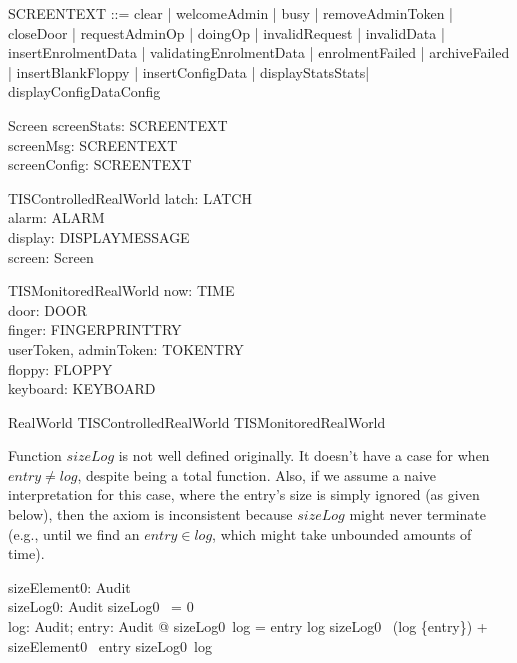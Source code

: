 \begin{zed}
SCREENTEXT ::= clear | welcomeAdmin | busy | removeAdminToken | closeDoor | requestAdminOp | doingOp | invalidRequest | invalidData | insertEnrolmentData | validatingEnrolmentData | enrolmentFailed | archiveFailed | insertBlankFloppy | insertConfigData | displayStats\ldata Stats\rdata | displayConfigData\ldata Config\rdata
\end{zed}

\begin{schema}{Screen}
  screenStats: SCREENTEXT\\
  screenMsg: SCREENTEXT\\
  screenConfig: SCREENTEXT
\end{schema}

\begin{schema}{TISControlledRealWorld}
  latch: LATCH\\
  alarm: ALARM\\
  display: DISPLAYMESSAGE\\
  screen: Screen
\end{schema}

\begin{schema}{TISMonitoredRealWorld}
  now: TIME\\
  door: DOOR\\
  finger: FINGERPRINTTRY\\
  userToken, adminToken: TOKENTRY\\
  floppy: FLOPPY\\
  keyboard: KEYBOARD
\end{schema}

\begin{zed}
RealWorld  TISControlledRealWorld \land  TISMonitoredRealWorld
\end{zed}

Function $sizeLog$ is not well defined originally. It doesn't have
a case for when $entry \neq log$, despite being a total function.
Also, if we assume a naive interpretation for this case, where the
entry's size is simply ignored (as given below), then the axiom is
inconsistent because $sizeLog$ might never terminate (e.g., until we
find an $entry \in log$, which might take unbounded amounts of time).
%
\begin{axdef}
  sizeElement0: Audit \fun  \nat \\
  sizeLog0: \finset  Audit \fun  \nat
\where
     sizeLog0~ \emptyset = 0
    \\
    \forall log: \finset Audit; entry: Audit @ sizeLog0~log =
        \IF entry \in log \THEN sizeLog0~ (log \setminus \{entry\}) + sizeElement0~ entry
        \ELSE sizeLog0~log
\end{axdef}

